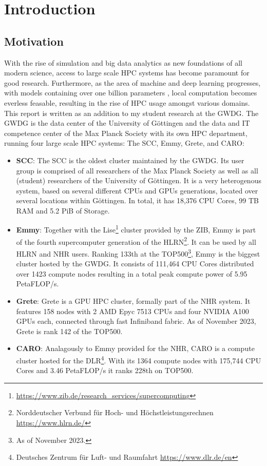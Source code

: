 \section{Introduction}
\subsection{Motivation}
With the rise of simulation and big data analytics as new foundations of all modern science,
access to large scale \ac{HPC} systems has become paramount for good research. Furthermore,
as the area of machine and deep learning progresses, with models containing over one billion
parameters \cite{gpt4param},  local computation becomes everless feasable, resulting in the 
rise of \ac{HPC} usage amongst various domains.\\

This report is written as an addition to my student research at the \ac{GWDG}. The \ac{GWDG} is the
data center of the University of Göttingen and the data and IT competence center of the 
Max Planck Society with its own \ac{HPC} department, running four large scale \ac{HPC} systems:
The \ac{SCC}, Emmy, Grete, and CARO:
\begin{itemize}
\item \textbf{\ac{SCC}}\cite{SCC}: The \ac{SCC} is the oldest cluster maintained 
by the \ac{GWDG}. Its user group is comprised of all researchers of the Max Planck Society as 
well as all (student) researchers of the University of Göttingen. It is a very heterogenous system,
based on several different CPUs and GPUs generations, located over several locations within 
Göttingen. In total, it has 18,376 CPU Cores, 99 TB RAM and 5.2 PiB of Storage.
\item \textbf{Emmy}\cite{Emmy}: Together with the Lise\footnote{
\url{https://www.zib.de/research_services/supercomputing}} cluster provided by the ZIB, Emmy is 
part of  the fourth supercomputer generation of the HLRN\footnote{Norddeutscher Verbund für Hoch- 
und Höchstleistungsrechnen \url{https://www.hlrn.de/}}. It can be used by all HLRN and NHR users.
Ranking 133th at the TOP500\footnote{As of November 2023.}, Emmy is the biggest cluster hosted by
the \ac{GWDG}. It consists of 111,464 CPU Cores distributed over 1423 compute nodes resulting 
in a total peak compute power of 5.95 PetaFLOP/s.
\item \textbf{Grete}: Grete is a GPU \ac{HPC} cluster, formally part of the NHR system.
It features 158 nodes with 2 AMD Epyc 7513 CPUs and four NVIDIA A100 GPUs each, connected through fast
Infiniband fabric. As of November 2023, Grete is rank 142 of the TOP500.
\item \textbf{CARO}\cite{CARO}: Analagously to Emmy provided for the NHR, CARO is a compute cluster
hosted for the DLR\footnote{Deutsches Zentrum für Luft- und Raumfahrt \url{https://www.dlr.de/en}}.
With its 1364 compute nodes with 175,744 CPU Cores and 3.46 PetaFLOP/s it ranks 228th on TOP500.
\end{itemize}


